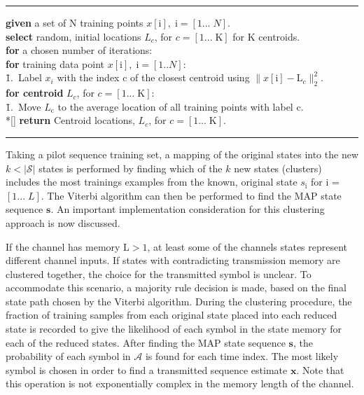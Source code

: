     \noindent\rule[10pt]{\textwidth}{0.4pt}
    {\footnotesize
    \begin{tabbing}
        {\textbf {given}} a set of N training points $x[{\mathrm{i}}], \;\mathrm{i} = [1...\;N]$.\\
    {\textbf {select}} random, initial locations $L_c$, for $c = [1...\; \text{K}]$ for K centroids.\\
        {\textbf{for} a chosen number of iterations}:\\
         \qquad \= {\textbf {for} training data point $x[{\mathrm{i}}], \;\mathrm{i} = [1..N]$}:\\
        \qquad \qquad \= 1.\ Label $x_i$ with the index c of the closest centroid using $\|x[{\mathrm{i}}]- \text{L}_c\|^2_2$. \\
        \qquad \= {\textbf {for centroid} $L_c$, for $c = [1...\; \text{K}]$}:\\
                \qquad \qquad \= 1.\ Move $L_{\mathrm{c}}$ to the average location of all training points with label c.\\*[\smallskipamount]
        {\textbf{return}} Centroid locations, $L_c$, for $c = [1...\; \text{K}]$.
    \end{tabbing}}
    \noindent\rule[10pt]{\textwidth}{0.4pt}
    
Taking a pilot sequence training set, a mapping of the original states into the new $k<|\mathcal{S}|$ states is performed by finding which of the $k$ new states (clusters) includes the most trainings examples from the known, original state $s_{\text{i}}$ for i = $[1...\; L]$. The Viterbi algorithm can then be performed to find the MAP state sequence $\mathbf{s}$. 
An important implementation consideration for this clustering approach is now discussed. 
\par
If the channel has memory $\text{L}>1$, at least some of the channels states represent different channel inputs. If states with contradicting transmission memory are clustered together, the choice for the transmitted symbol is unclear. To accommodate this scenario, a majority rule decision is made, based on the final state path chosen by the Viterbi algorithm. During the clustering procedure, the fraction of training samples from each original state placed into each reduced state is recorded to give the likelihood of each symbol in the state memory for each of the reduced states. After finding the MAP state sequence $\mathbf{s}$, the probability of each symbol in $\mathcal{A}$ is found for each time index. The most likely symbol is chosen in order to find a transmitted sequence estimate $\mathbf{x}$. Note that this operation is not exponentially complex in the memory length of the channel.

